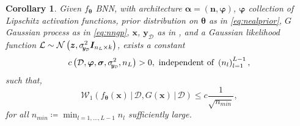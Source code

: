 \documentclass[a4paper, 11pt, reqno]{amsart}
\theoremstyle{plain}
\newtheorem{corollary}[theorem]{Corollary}
\theoremstyle{remark}
\theoremstyle{definition}
\newcommand{\given}{\, | \,}
\newcommand{\normal}[2]{\mathcal{N}\left(#1, #2\right)}
\newcommand{\wass}[3][2]{\mathcal{W}_{#1}\left(#2, #3\right)}
\newcommand{\train}{\mathcal{D}}
\newcommand{\sigmay}{\sigma_{\scalebox{0.65}{$\kern-3pt\bm{y}_{\mathcal{D}}$}}}%
\begin{document}
\begin{corollary} \label{cor:convposterior}
	Given $f_{\bm{\theta}}$ BNN, with architecture $\bm{\alpha} = (\bm{n}, \bm{\varphi})$, $\bm{\varphi}$ collection of Lipschitz activation functions, prior distribution on $\bm{\theta}$ as in \cref{eq:nealprior}, $G$ Gaussian process as in \cref{eq:nngp}, $\bm{x}$, $\bm{y}_{\mathcal{D}}$ as in , and a Gaussian likelihood function $\mathcal{L} \sim \normal{\bm{z}}{\sigmay^2 \bm{I}_{n_L \times k}}$, exists a constant
	\begin{equation*}
		c\left(\train, \bm{\varphi}, \bm{\sigma}, \sigmay^2, n_L\right) > 0, \text{ independent of } \left(n_l\right)_{l = 1}^{L - 1},
	\end{equation*}
	such that,
	\begin{equation*}
		\wass[1]{f_{\bm{\theta}}(\bm{x}) \given \train}{G(\bm{x}) \given \train} \leq c \frac{1}{\sqrt{n_{min}}},
	\end{equation*}
	for all $\displaystyle n_{min} \coloneqq \min_{l = 1, \dots, L - 1} n_l$ sufficiently large.
\end{corollary}
\end{document}
